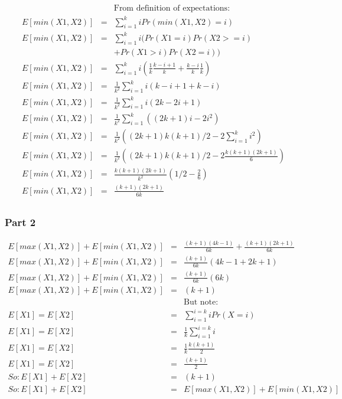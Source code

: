 \documentclass[10pt]{article}
\begin{document}
\begin{eqnarray}
&&\text{From definition of expectations:}\\
E[min(X1, X2)] &=& \sum_{i=1}^{k} i Pr(min(X1, X2)=i)\\
E[min(X1, X2)] &=& \sum_{i=1}^{k} i (Pr(X1=i)Pr(X2>=i) \\
&& + Pr(X1>i)Pr(X2=i))\\
E[min(X1, X2)] &=& \sum_{i=1}^{k} i (\frac{1}{k}\frac{k-i+1}{k} + \frac{k-i}{k}\frac{1}{k})\\
E[min(X1, X2)] &=& \frac{1}{k^{2}}\sum_{i=1}^{k} i (k-i+1 + k-i)\\
E[min(X1, X2)] &=& \frac{1}{k^{2}}\sum_{i=1}^{k} i (2k-2i+1)\\
E[min(X1, X2)] &=& \frac{1}{k^{2}}\sum_{i=1}^{k} ((2k+1)i-2i^{2})\\
E[min(X1, X2)] &=& \frac{1}{k^{2}}((2k+1)k(k+1)/2-2\sum_{i=1}^{k}i^{2})\\
E[min(X1, X2)] &=& \frac{1}{k^{2}}((2k+1)k(k+1)/2-2\frac{k(k+1)(2k+1)}{6})\\
E[min(X1, X2)] &=& \frac{k(k+1)(2k+1)}{k^{2}}(1/2-\frac{2}{6})\\
E[min(X1, X2)] &=& \frac{(k+1)(2k+1)}{6k}\\
\end{eqnarray}

\subsubsection*{Part 2}
\begin{eqnarray}
E[max(X1, X2)] + E[min(X1, X2)] &=& \frac{(k+1)(4k-1)}{6k}+\frac{(k+1)(2k+1)}{6k}\\
E[max(X1, X2)] + E[min(X1, X2)] &=& \frac{(k+1)}{6k}(4k-1+2k+1)\\
E[max(X1, X2)] + E[min(X1, X2)] &=& \frac{(k+1)}{6k}(6k)\\
E[max(X1, X2)] + E[min(X1, X2)] &=& (k+1)\\
&&\text{But note:}\\
E[X1]=E[X2] &=& \sum_{i=1}^{i=k}iPr(X=i)\\
E[X1]=E[X2] &=& \frac{1}{k}\sum_{i=1}^{i=k}i\\
E[X1]=E[X2] &=& \frac{1}{k}\frac{k(k+1)}{2}\\
E[X1]=E[X2] &=& \frac{(k+1)}{2}\\
So: E[X1]+E[X2] &=& (k+1)\\
So: E[X1]+E[X2] &=& E[max(X1, X2)] + E[min(X1, X2)]\\
\end{eqnarray}
\end{document}
